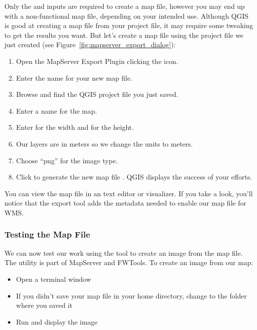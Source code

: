 Only the  and  inputs are 
required to create a map file, however you may end up with a non-functional 
map file, depending on your intended use. Although QGIS is good at creating 
a map file from your project file, it may require some tweaking to get the 
results you want. But let's create a map file using the project file 
 we just created 
(see Figure~\ref{fig:mapserver_export_dialog}):

\begin{enumerate}
  \item Open the MapServer Export Plugin clicking the 
   icon.
  \item Enter the name  for your new map file.
  \item Browse and find the QGIS project file  
  you just saved.
  \item Enter a name  for the map.
  \item Enter  for the width and  for the height.
  \item Our layers are in meters so we change the units to meters.
  \item Choose ``png'' for the image type.
  \item Click  to generate the new map file . 
  QGIS displays the success of your efforts.
\end{enumerate}

You can view the map file in an text editor or visualizer. If you
take a look, you'll notice that the export tool adds the metadata needed
to enable our map file for WMS. 

\subsubsection{Testing the Map File}

We can now test our work using the  tool to create an image
from the map file. The  utility is part of MapServer and FWTools. 
To create an image from our map:

\begin{itemize}
\item Open a terminal window
\item If you didn't save your map file in your home directory, change to
  the folder where you saved it
\item Run  and 
  display the image 
\end{itemize}
 
